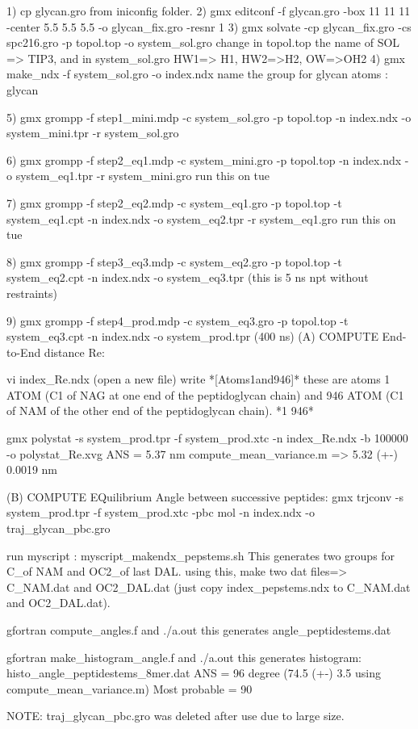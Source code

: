1) cp glycan.gro from iniconfig folder.
2) gmx editconf -f glycan.gro -box 11 11 11 -center 5.5 5.5 5.5 -o glycan_fix.gro -resnr 1
3) gmx solvate -cp glycan_fix.gro -cs spc216.gro -p topol.top -o system_sol.gro 
 change in topol.top the name of SOL => TIP3, and in system_sol.gro HW1=> H1, HW2=>H2, OW=>OH2
4) gmx make_ndx -f system_sol.gro -o index.ndx 
  name the group for glycan atoms : glycan

5) gmx grompp -f step1_mini.mdp -c system_sol.gro -p topol.top -n index.ndx -o system_mini.tpr -r system_sol.gro 

6) gmx grompp -f step2_eq1.mdp -c system_mini.gro -p topol.top -n index.ndx -o system_eq1.tpr -r system_mini.gro 
    run this on tue

7) gmx grompp -f step2_eq2.mdp -c system_eq1.gro -p topol.top -t system_eq1.cpt  -n index.ndx -o system_eq2.tpr -r system_eq1.gro 
    run this on tue

8) gmx grompp -f step3_eq3.mdp -c system_eq2.gro -p topol.top -t system_eq2.cpt -n index.ndx -o system_eq3.tpr  (this is 5 ns npt without restraints)

9) gmx grompp -f step4_prod.mdp -c system_eq3.gro -p topol.top -t system_eq3.cpt -n index.ndx -o system_prod.tpr 
(400 ns)
(A) COMPUTE End-to-End distance Re:

 vi index_Re.ndx (open a new file) 
   write *[Atoms1and946]* these are atoms 1 ATOM (C1 of NAG at one end of the peptidoglycan chain) and 946 ATOM (C1 of NAM of the other end of the peptidoglycan chain).
         *1  946* 

 gmx polystat -s system_prod.tpr -f system_prod.xtc -n index_Re.ndx -b 100000 -o polystat_Re.xvg 
              ANS = 5.37 nm  
            compute_mean_variance.m => 5.32 (+-) 0.0019 nm


(B) COMPUTE EQuilibrium Angle between successive peptides:
 gmx trjconv -s system_prod.tpr -f system_prod.xtc -pbc mol -n index.ndx -o traj_glycan_pbc.gro

      run myscript : myscript_makendx_pepstems.sh 
                 This generates two groups for C_of NAM and OC2_of last DAL. using this, make two dat files=> C_NAM.dat and OC2_DAL.dat (just copy index_pepstems.ndx to C_NAM.dat and OC2_DAL.dat). 

     gfortran compute_angles.f  and ./a.out
       this generates angle_peptidestems.dat 

     gfortran make_histogram_angle.f  and ./a.out 
       this generates histogram: histo_angle_peptidestems_8mer.dat
           ANS = 96 degree  (74.5 (+-) 3.5 using compute_mean_variance.m)
           Most probable = 90

        NOTE: traj_glycan_pbc.gro was deleted after use due to large size.





